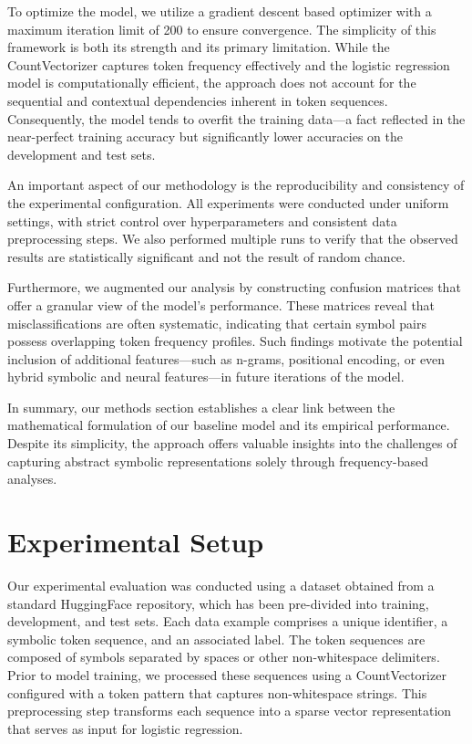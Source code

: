 \documentclass{article}
\begin{document}
To optimize the model, we utilize a gradient descent based optimizer with a maximum iteration limit of 200 to ensure convergence. The simplicity of this framework is both its strength and its primary limitation. While the CountVectorizer captures token frequency effectively and the logistic regression model is computationally efficient, the approach does not account for the sequential and contextual dependencies inherent in token sequences. Consequently, the model tends to overfit the training data—a fact reflected in the near-perfect training accuracy but significantly lower accuracies on the development and test sets.

An important aspect of our methodology is the reproducibility and consistency of the experimental configuration. All experiments were conducted under uniform settings, with strict control over hyperparameters and consistent data preprocessing steps. We also performed multiple runs to verify that the observed results are statistically significant and not the result of random chance.

Furthermore, we augmented our analysis by constructing confusion matrices that offer a granular view of the model’s performance. These matrices reveal that misclassifications are often systematic, indicating that certain symbol pairs possess overlapping token frequency profiles. Such findings motivate the potential inclusion of additional features—such as n-grams, positional encoding, or even hybrid symbolic and neural features—in future iterations of the model.

In summary, our methods section establishes a clear link between the mathematical formulation of our baseline model and its empirical performance. Despite its simplicity, the approach offers valuable insights into the challenges of capturing abstract symbolic representations solely through frequency-based analyses.

\section{Experimental Setup}
Our experimental evaluation was conducted using a dataset obtained from a standard HuggingFace repository, which has been pre-divided into training, development, and test sets. Each data example comprises a unique identifier, a symbolic token sequence, and an associated label. The token sequences are composed of symbols separated by spaces or other non-whitespace delimiters. Prior to model training, we processed these sequences using a CountVectorizer configured with a token pattern that captures non-whitespace strings. This preprocessing step transforms each sequence into a sparse vector representation that serves as input for logistic regression.
\end{document}

